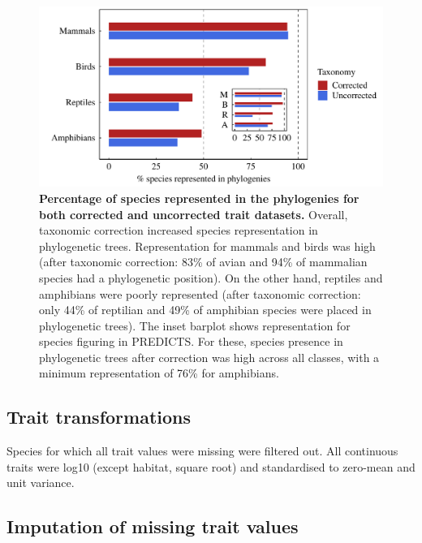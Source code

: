 \begin{figure}[h!]
\centering
\includegraphics[scale=0.7]{figures/chapter2/Species_representation_phylo}
\caption[Percentage of species represented in the phylogenies for both corrected and uncorrected trait datasets]{\textbf{Percentage of species represented in the phylogenies for both corrected and uncorrected trait datasets.} Overall, taxonomic correction increased species representation in phylogenetic trees. Representation for mammals and birds was high (after taxonomic correction: 83\% of avian and 94\% of mammalian species had a phylogenetic position). On the other hand, reptiles and amphibians were poorly represented (after taxonomic correction: only 44\% of reptilian and 49\% of amphibian species were placed in phylogenetic trees). The inset barplot shows representation for species figuring in PREDICTS. For these, species presence in phylogenetic trees after correction was high across all classes, with a minimum representation of 76\% for amphibians.}
\label{species_rep_phylo}
\end{figure}


\subsection{Trait transformations}
Species for which all trait values were missing were filtered out. All continuous traits were log10 (except habitat, square root) and standardised to zero-mean and unit variance.


\subsection{Imputation of missing trait values}




